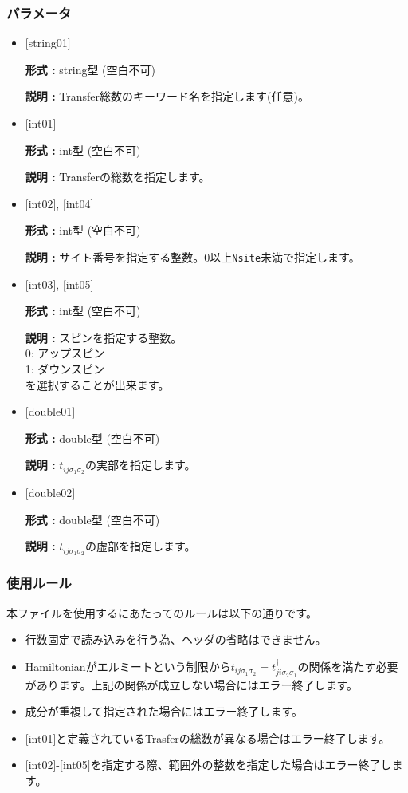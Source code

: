 \subsubsection{パラメータ}
 \begin{itemize}

   \item  $[$string01$]$
   
    {\bf 形式 :} string型 (空白不可)

   {\bf 説明 :} Transfer総数のキーワード名を指定します(任意)。

   \item  $[$int01$]$
   
    {\bf 形式 :} int型 (空白不可)

   {\bf 説明 :} Transferの総数を指定します。

  \item  $[$int02$]$, $[$int04$]$

 {\bf 形式 :} int型 (空白不可)

{\bf 説明 :} サイト番号を指定する整数。0以上\verb|Nsite|{未満}で指定します。
 
  \item  $[$int03$]$, $[$int05$]$

 {\bf 形式 :} int型 (空白不可)

{\bf 説明 :} スピンを指定する整数。\\
0: アップスピン\\
1: ダウンスピン\\
を選択することが出来ます。


 \item  $[$double01$]$
   
   {\bf 形式 :} double型 (空白不可)

  {\bf 説明 :}  $t_{ij\sigma_1\sigma_2}$の実部を指定します。

 \item  $[$double02$]$
   
   {\bf 形式 :} double型 (空白不可)

  {\bf 説明 :}  $t_{ij\sigma_1\sigma_2}$の虚部を指定します。
\end{itemize}

\subsubsection{使用ルール}
本ファイルを使用するにあたってのルールは以下の通りです。
\begin{itemize}
\item 行数固定で読み込みを行う為、ヘッダの省略はできません。
\item Hamiltonianがエルミートという制限から$t_{ij\sigma_1\sigma_2}=t_{ji\sigma_2\sigma_1}^{\dagger}$の関係を満たす必要があります。上記の関係が成立しない場合にはエラー終了します。
\item 成分が重複して指定された場合にはエラー終了します。
\item $[$int01$]$と定義されているTrasferの総数が異なる場合はエラー終了します。
\item $[$int02$]$-$[$int05$]$を指定する際、範囲外の整数を指定した場合はエラー終了します。
\end{itemize}

